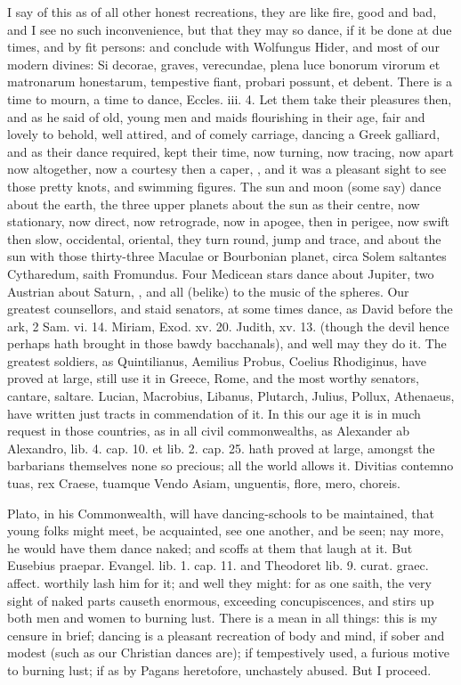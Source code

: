 {I say of this as of all other honest recreations, they are like fire,
good and bad, and I see no such inconvenience, but that they may so
dance, if it be done at due times, and by fit persons: and conclude
with Wolfungus Hider, and most of our modern divines: Si decorae,
graves, verecundae, plena luce bonorum virorum et matronarum
honestarum, tempestive fiant, probari possunt, et debent. There is a
time to mourn, a time to dance, Eccles. iii. 4. Let them take their
pleasures then, and as  he said of old, young men and maids
flourishing in their age, fair and lovely to behold, well attired, and
of comely carriage, dancing a Greek galliard, and as their dance
required, kept their time, now turning, now tracing, now apart now
altogether, now a courtesy then a caper, \etc{}, and it was a pleasant
sight to see those pretty knots, and swimming figures. The sun and moon
(some say) dance about the earth, the three upper planets about the sun
as their centre, now stationary, now direct, now retrograde, now in
apogee, then in perigee, now swift then slow, occidental, oriental,
they turn round, jump and trace, \Venus{} and \Mercury{} about the sun with those
thirty-three Maculae or Bourbonian planet, circa Solem saltantes
Cytharedum, saith Fromundus. Four Medicean stars dance about Jupiter,
two Austrian about Saturn, \etc{}, and all (belike) to the music of the
spheres. Our greatest counsellors, and staid senators, at some times
dance, as David before the ark, 2 Sam. vi. 14. Miriam, Exod. xv. 20.
Judith, xv. 13. (though the devil hence perhaps hath brought in those
bawdy bacchanals), and well may they do it. The greatest soldiers, as
 Quintilianus, Aemilius Probus, Coelius Rhodiginus,
have proved at large, still use it in Greece, Rome, and the most worthy
senators, cantare, saltare. Lucian, Macrobius, Libanus, Plutarch,
Julius, Pollux, Athenaeus, have written just tracts in commendation of
it. In this our age it is in much request in those countries, as in all
civil commonwealths, as Alexander ab Alexandro, lib. 4. cap. 10. et
lib. 2. cap. 25. hath proved at large, amongst the barbarians
themselves none so precious; all the world allows it.
Divitias contemno tuas, rex Craese, tuamque
Vendo Asiam, unguentis, flore, mero, choreis.

Plato, in his Commonwealth, will have dancing-schools to be
maintained, that young folks might meet, be acquainted, see one
another, and be seen; nay more, he would have them dance naked; and
scoffs at them that laugh at it. But Eusebius praepar. Evangel. lib. 1.
cap. 11. and Theodoret lib. 9. curat. graec. affect. worthily lash him
for it; and well they might: for as one saith, the very sight of
naked parts causeth enormous, exceeding concupiscences, and stirs up
both men and women to burning lust. There is a mean in all things: this
is my censure in brief; dancing is a pleasant recreation of body and
mind, if sober and modest (such as our Christian dances are); if
tempestively used, a furious motive to burning lust; if as by Pagans
heretofore, unchastely abused. But I proceed.

}
